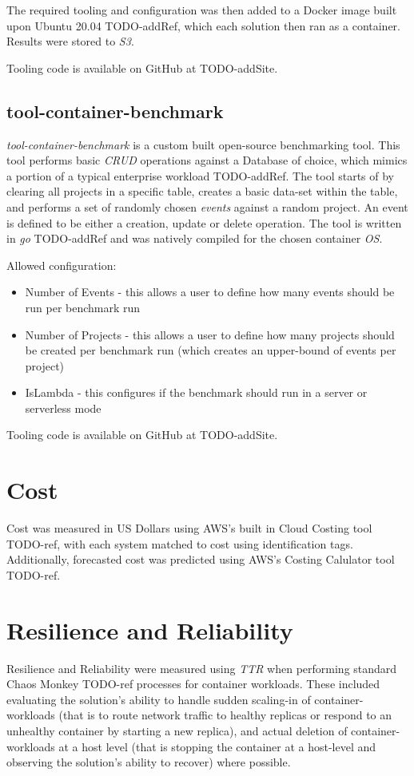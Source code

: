 The required tooling and configuration was then added to a Docker image built upon Ubuntu 20.04 TODO-addRef, which each solution then ran as a container.
Results were stored to \emph{S3}.

Tooling code is available on GitHub at TODO-addSite.

\subsection{tool-container-benchmark}
\textit{tool-container-benchmark} is a custom built open-source benchmarking tool. This tool performs basic \emph{CRUD} operations against a Database of choice,
which mimics a portion of a typical enterprise workload TODO-addRef. The tool starts of by clearing all projects in a specific table, creates a basic data-set within the table,
and performs a set of randomly chosen \textit{events} against a random project. An event is defined to be either a creation, update or delete operation.
The tool is written in \emph{go} TODO-addRef and was natively compiled for the chosen container \emph{OS}.

Allowed configuration:
\begin{itemize}
  \item Number of Events - this allows a user to define how many events should be run per benchmark run
  \item Number of Projects - this allows a user to define how many projects should be created per benchmark run (which creates an upper-bound of events per project)
  \item IsLambda - this configures if the benchmark should run in a server or serverless mode
\end{itemize}

Tooling code is available on GitHub at TODO-addSite.

\section{Cost}
Cost was measured in US Dollars using AWS's built in Cloud Costing tool TODO-ref, with each system matched to cost using identification tags.
Additionally, forecasted cost was predicted using AWS's Costing Calulator tool TODO-ref.

\section{Resilience and Reliability}
Resilience and Reliability were measured using \textit{TTR} when performing standard Chaos Monkey TODO-ref processes for container workloads.
These included evaluating the solution's ability to handle sudden scaling-in of container-workloads (that is to route network traffic to healthy replicas or respond to an unhealthy container by starting a new replica),
and actual deletion of container-workloads at a host level (that is stopping the container at a host-level and observing the solution's ability to recover) where possible.

